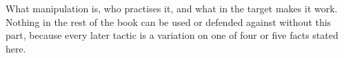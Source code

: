 
\begin{partblurb}
What manipulation is, who practises it, and what in the target makes it work. Nothing in the rest of the book can be used or defended against without this part, because every later tactic is a variation on one of four or five facts stated here.
\end{partblurb}
